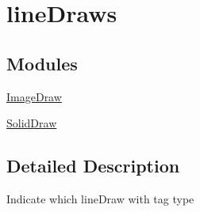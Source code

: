 \hypertarget{group__line_draws}{
\section{lineDraws}
\label{d9/d4a/group__line_draws}
}
\subsection*{Modules}
\begin{DoxyCompactItemize}
\item 
\hyperlink{group___image_draw}{ImageDraw}
\item 
\hyperlink{group___solid_draw}{SolidDraw}
\end{DoxyCompactItemize}


\subsection{Detailed Description}
Indicate which lineDraw with tag type 
